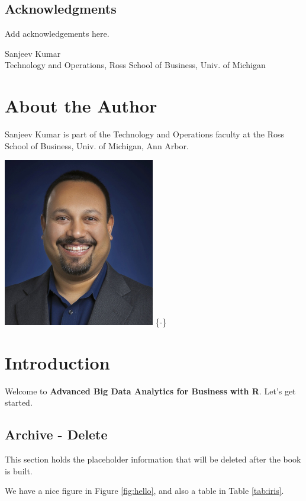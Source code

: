 \documentclass[]{krantz}
\theoremstyle{definition}
\theoremstyle{definition}
\theoremstyle{definition}
\theoremstyle{remark}
\let\BeginKnitrBlock\begin \let\EndKnitrBlock\end
\begin{document}
\section*{Acknowledgments}\label{acknowledgments}


Add acknowledgements here.

\BeginKnitrBlock{flushright}
Sanjeev Kumar\\
Technology and Operations, Ross School of Business, Univ. of Michigan
\EndKnitrBlock{flushright}

\chapter*{About the Author}\label{about-the-author}


Sanjeev Kumar is part of the Technology and Operations faculty at the
Ross School of Business, Univ. of Michigan, Ann Arbor.

\includegraphics[width=2.60417in]{images/SanjeevKumar.jpg} \{-\}

\mainmatter

\chapter{Introduction}\label{introduction}

Welcome to \textbf{Advanced Big Data Analytics for Business with R}.
Let's get started.

\section{Archive - Delete}\label{archive---delete}

This section holds the placeholder information that will be deleted
after the book is built.

We have a nice figure in Figure \ref{fig:hello}, and also a table in
Table \ref{tab:iris}.
\end{document}
